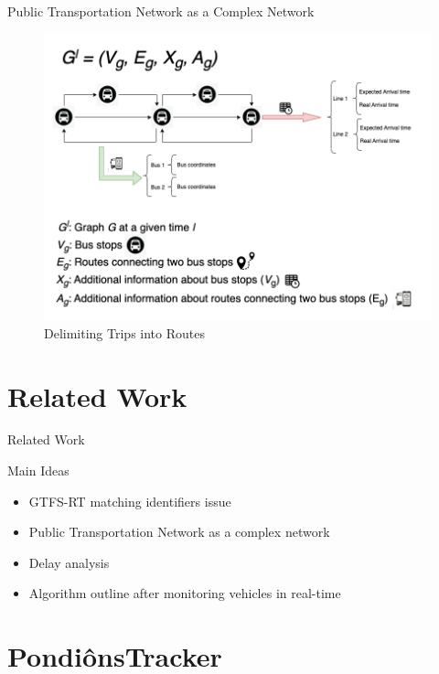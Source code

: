 \documentclass[xcolor=dvipsnames,table]{beamer}
\begin{document}
\begin{frame}{Public Transportation Network as a Complex Network}
        \begin{figure}[H]
                \centering
                \includegraphics[scale=0.3]{images/final_graph.png}
                \caption{Delimiting Trips into Routes}
        \end{figure}
\end{frame}


\section{Related Work}
\begin{frame}{Related Work}
        \begin{block}{Main Ideas}
                \begin{itemize}
                        \item GTFS-RT matching identifiers issue 
                        \item Public Transportation Network as a complex network
                        \item Delay analysis
                        \item Algorithm outline after monitoring vehicles in real-time
                \end{itemize}
        \end{block}
\end{frame}

\section{PondiônsTracker}
\end{document}
